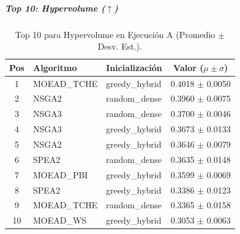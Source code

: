 \subparagraph{Top 10: Hypervolume ($\uparrow$)}
\begin{table}[H]
    \centering
    \begin{tabular}{cllc}
        \toprule
        Pos & Algoritmo & Inicialización & Valor ($\mu \pm \sigma$) \\
        \midrule
        1 & MOEAD\_TCHE & greedy\_hybrid & 0.4018 $\pm$ 0.0050 \\
        2 & NSGA2 & random\_dense & 0.3960 $\pm$ 0.0075 \\
        3 & NSGA3 & random\_dense & 0.3700 $\pm$ 0.0046 \\
        4 & NSGA3 & greedy\_hybrid & 0.3673 $\pm$ 0.0133 \\
        5 & NSGA2 & greedy\_hybrid & 0.3646 $\pm$ 0.0079 \\
        6 & SPEA2 & random\_dense & 0.3635 $\pm$ 0.0148 \\
        7 & MOEAD\_PBI & greedy\_hybrid & 0.3599 $\pm$ 0.0069 \\
        8 & SPEA2 & greedy\_hybrid & 0.3386 $\pm$ 0.0123 \\
        9 & MOEAD\_TCHE & random\_dense & 0.3365 $\pm$ 0.0158 \\
        10 & MOEAD\_WS & greedy\_hybrid & 0.3053 $\pm$ 0.0063 \\
        \bottomrule
    \end{tabular}
    \caption{Top 10 para Hypervolume en Ejecución A (Promedio $\pm$ Desv. Est.).}
\end{table}

